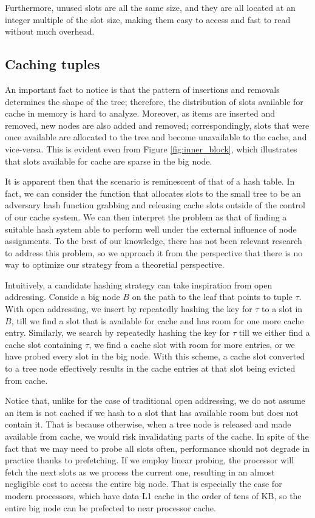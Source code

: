 \documentclass{article}
\begin{document}
Furthermore, unused slots are all the same size, and they are all located at an
integer multiple
of the slot size, making them easy to access and fast to read without much
overhead.


\subsection{Caching tuples}
An important fact to notice is that the pattern of insertions and removals
determines the shape of the tree;
therefore, the distribution of slots available for cache in memory is hard to
analyze.
Moreover, as items are inserted and removed, new nodes are also added and
removed;
correspondingly, slots that were once available are allocated to the
tree and become unavailable to the cache, and vice-versa.
This is evident even from Figure \ref{fig:inner_block}, which illustrates that
slots available for cache are sparse in the big node.

It is apparent then that the scenario is reminescent of that of a hash table.
In fact, we can consider the function that allocates slots to the small tree to
be an adversary
hash function grabbing and releasing cache slots outside of the control of
our cache system.
We can then interpret the problem as that of finding a suitable hash system
able to perform well under the external influence of node assignments.
To the best of our knowledge, there has not been relevant research
to address this problem, so we approach it from the perspective that there
is no way to optimize our strategy from a theoretial perspective.

Intuitively, a candidate hashing strategy can take inspiration from open
addressing.
Conside a big node $B$ on the path to the leaf that points to tuple $\tau$.
With open addressing, we insert by repeatedly hashing the key for $\tau$ to a
slot in $B$,
till we find a slot that is available for cache and has room for one more cache
entry.
Similarly, we search by repeatedly hashing the key for $\tau$ till we either
find
a cache slot containing $\tau$, we find a cache slot with room for more entries,
or we have probed every slot in the big node.
With this scheme, a cache slot converted to a tree node effectively results
in the cache entries at that slot being evicted from cache.

Notice that, unlike for the case of traditional open addressing, we do not
assume an item is not cached
if we hash to a slot that has available room but does not contain it.
That is because otherwise, when a tree node is released and made available from
cache, we would risk
invalidating parts of the cache.
In spite of the fact that we may need to probe all slots often, performance
should not degrade in practice
thanks to prefetching.
If we employ linear probing, the processor will fetch the next slots as we
process the current one,
resulting in an almost negligible cost to access the entire big node.
That is especially the case for modern processors, which have data L1 cache in
the order of tens of KB,
so the entire big node can be prefected to near processor cache.
\end{document}
